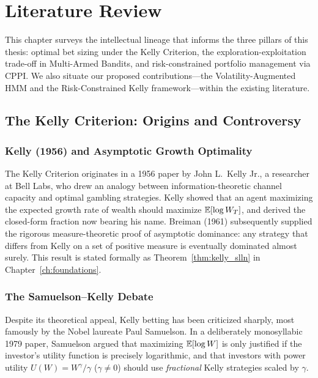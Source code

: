 \chapter{Literature Review}
\label{ch:literature}

This chapter surveys the intellectual lineage that informs the three pillars
of this thesis: optimal bet sizing under the Kelly Criterion, the
exploration-exploitation trade-off in Multi-Armed Bandits, and
risk-constrained portfolio management via CPPI.  We also situate our proposed
contributions---the Volatility-Augmented HMM and the Risk-Constrained Kelly
framework---within the existing literature.

\section{The Kelly Criterion: Origins and Controversy}

\subsection{Kelly (1956) and Asymptotic Growth Optimality}

The Kelly Criterion originates in a 1956 paper by John L.\ Kelly Jr., a
researcher at Bell Labs, who drew an analogy between information-theoretic
channel capacity and optimal gambling strategies.  Kelly showed that an agent
maximizing the expected growth rate of wealth should maximize $\mathbb{E}[\log W_T]$,
and derived the closed-form fraction now bearing his name.  Breiman (1961)
subsequently supplied the rigorous measure-theoretic proof of asymptotic
dominance: any strategy that differs from Kelly on a set of positive measure
is eventually dominated almost surely.  This result is stated formally as
Theorem~\ref{thm:kelly_slln} in Chapter~\ref{ch:foundations}.

\subsection{The Samuelson--Kelly Debate}

Despite its theoretical appeal, Kelly betting has been criticized sharply,
most famously by the Nobel laureate Paul Samuelson.  In a deliberately
monosyllabic 1979 paper, Samuelson argued that maximizing $\mathbb{E}[\log W]$ is
only justified if the investor's utility function is precisely logarithmic,
and that investors with power utility $U(W) = W^\gamma/\gamma$ ($\gamma \neq 0$)
should use \emph{fractional} Kelly strategies scaled by $\gamma$.

